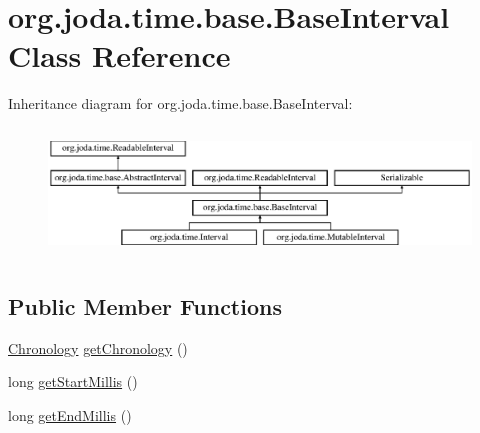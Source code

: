 \hypertarget{classorg_1_1joda_1_1time_1_1base_1_1_base_interval}{\section{org.\-joda.\-time.\-base.\-Base\-Interval Class Reference}
\label{classorg_1_1joda_1_1time_1_1base_1_1_base_interval}
}
Inheritance diagram for org.\-joda.\-time.\-base.\-Base\-Interval\-:\begin{figure}[H]
\begin{center}
\leavevmode
\includegraphics[height=3.440860cm]{classorg_1_1joda_1_1time_1_1base_1_1_base_interval}
\end{center}
\end{figure}
\subsection*{Public Member Functions}
\begin{DoxyCompactItemize}
\item 
\hyperlink{classorg_1_1joda_1_1time_1_1_chronology}{Chronology} \hyperlink{classorg_1_1joda_1_1time_1_1base_1_1_base_interval_a3f055aa407fb82d43a5cd938deb5a6ab}{get\-Chronology} ()
\item 
long \hyperlink{classorg_1_1joda_1_1time_1_1base_1_1_base_interval_a33b3e11aa9506e42623080d52359e078}{get\-Start\-Millis} ()
\item 
long \hyperlink{classorg_1_1joda_1_1time_1_1base_1_1_base_interval_a0fd3cb7986fc643b4e8a2057f9a761c5}{get\-End\-Millis} ()
\end{DoxyCompactItemize}
